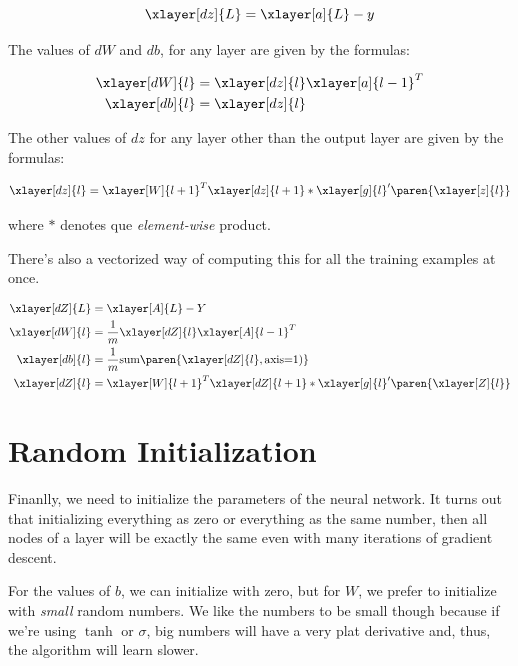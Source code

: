 \documentclass[12pt, a4paper, oneside]{book}
\begin{document}
\begin{equation}
    \xlayer[dz]{L}=\xlayer[a]{L}-y
    \label{last-dz}
\end{equation}

The values of $dW$ and $db$, for any layer are given by the formulas:

\begin{align}
    \xlayer[dW]{l}&=\xlayer[dz]{l}\xlayer[a]{l-1}^{T} \\
    \xlayer[db]{l}&=\xlayer[dz]{l}
    \label{dW-db}
\end{align}

The other values of $dz$ for any layer other than the output layer are given by
the formulas:

\begin{equation}
    \xlayer[dz]{l}=\xlayer[W]{l+1}^{T}\xlayer[dz]{l+1}*
    \xlayer[g]{l}'\paren{\xlayer[z]{l}}
    \label{dz-equation}
\end{equation}

where $*$ denotes que \textit{element-wise} product.

There's also a vectorized way of computing this for all the training examples at
once.

\begin{align}
    \xlayer[dZ]{L}&=\xlayer[A]{L}-Y \\
    \xlayer[dW]{l}&=\dfrac{1}{m}\xlayer[dZ]{l}\xlayer[A]{l-1}^{T} \\
    \xlayer[db]{l}&=\dfrac{1}{m}\text{sum}\paren{\xlayer[dZ]{l}, \text{axis=1})}
        \\
    \xlayer[dZ]{l}&=\xlayer[W]{l+1}^{T}\xlayer[dZ]{l+1}*
    \xlayer[g]{l}'\paren{\xlayer[Z]{l}}
\end{align}

\section{Random Initialization}%
\label{sec:random_initialization}

Finanlly, we need to initialize the parameters of the neural network. It turns
out that initializing everything as zero or everything as the same number, then
all nodes of a layer will be exactly the same even with many iterations of
gradient descent.

For the values of $b$, we can initialize with zero, but for $W$, we prefer to
initialize with \textit{small} random numbers. We like the numbers to be small
though because if we're using $\tanh$ or $\sigma$, big numbers will have a very
plat derivative and, thus, the algorithm will learn slower.
\end{document}
